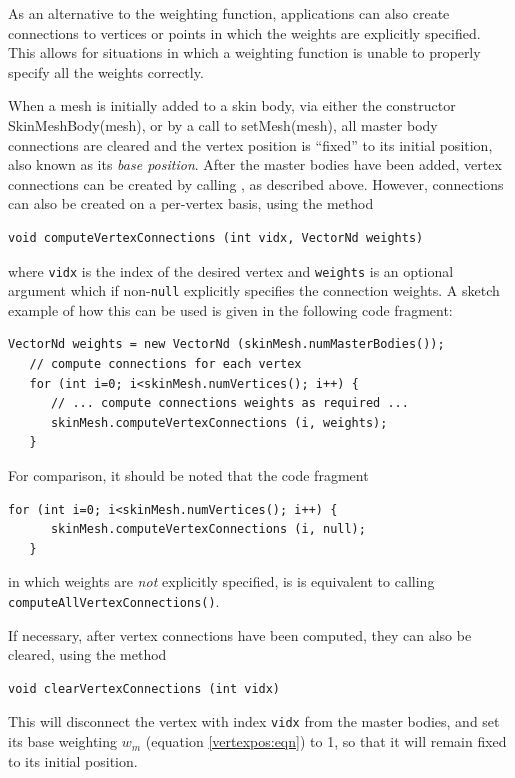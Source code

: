 As an alternative to the weighting function, applications can also
create connections to vertices or points in which the weights are
explicitly specified. This allows for situations in which a weighting
function is unable to properly specify all the weights correctly.

When a mesh is initially added to a skin body, via either the
constructor
%
{SkinMeshBody(mesh)},
or by a call to
%
{setMesh(mesh)},
all master body connections are cleared and the vertex position is
``fixed'' to its initial position, also known as its {\it base
position}. After the master bodies have been added, vertex connections
can be created by calling
,
as described above. However, connections can also be created on a
per-vertex basis, using the method
%
\begin{lstlisting}[]
  void computeVertexConnections (int vidx, VectorNd weights)
\end{lstlisting}
%
where {\tt vidx} is the index of the desired vertex and {\tt weights}
is an optional argument which if non-{\tt null} explicitly specifies
the connection weights. A sketch example of how this can be used is
given in the following code fragment:
%
\begin{lstlisting}[]
   VectorNd weights = new VectorNd (skinMesh.numMasterBodies());
   // compute connections for each vertex
   for (int i=0; i<skinMesh.numVertices(); i++) {
      // ... compute connections weights as required ...
      skinMesh.computeVertexConnections (i, weights);
   }
\end{lstlisting}
%
For comparison, it should be noted that the code fragment
\begin{lstlisting}[]
   for (int i=0; i<skinMesh.numVertices(); i++) {
      skinMesh.computeVertexConnections (i, null);
   }
\end{lstlisting}
in which weights are {\it not} explicitly specified, is
is equivalent to calling {\tt computeAllVertexConnections()}.

If necessary, after vertex connections have been computed, they can
also be cleared, using the method
%
\begin{lstlisting}[]
  void clearVertexConnections (int vidx)
\end{lstlisting}
%
This will disconnect the vertex with index {\tt vidx} from the master
bodies, and set its base weighting $w_m$ (equation
\ref{vertexpos:eqn}) to 1, so that it will remain fixed to its initial
position.

